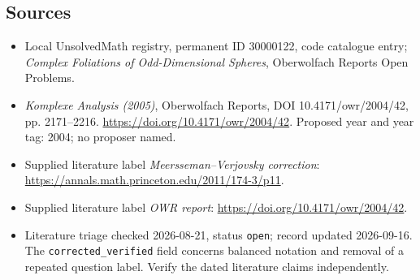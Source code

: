 \documentclass[11pt]{article}
\begin{document}
\subsection{Sources}
\begin{itemize}\item Local UnsolvedMath registry, permanent ID 30000122, code catalogue entry; \emph{Complex Foliations of Odd-Dimensional Spheres}, Oberwolfach Reports Open Problems.\item \emph{Komplexe Analysis (2005)}, Oberwolfach Reports, DOI 10.4171/owr/2004/42, pp. 2171--2216. \url{https://doi.org/10.4171/owr/2004/42}. Proposed year and year tag: 2004; no proposer named.\item Supplied literature label \emph{Meersseman--Verjovsky correction}: \url{https://annals.math.princeton.edu/2011/174-3/p11}.\item Supplied literature label \emph{OWR report}: \url{https://doi.org/10.4171/owr/2004/42}.\item Literature triage checked 2026-08-21, status \texttt{open}; record updated 2026-09-16. The \texttt{corrected\_verified} field concerns balanced notation and removal of a repeated question label. Verify the dated literature claims independently.\end{itemize}
\end{document}
